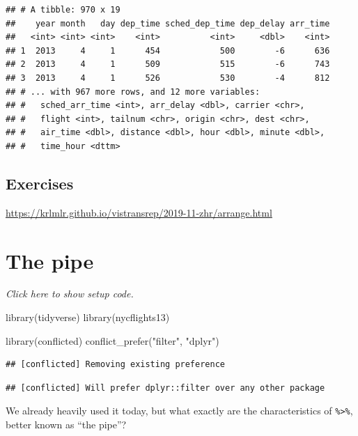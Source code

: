 \documentclass[]{book}
\newenvironment{Shaded}{}{}
\newcommand{\KeywordTok}[1]{\textcolor[rgb]{0.00,0.00,1.00}{#1}}
\newcommand{\NormalTok}[1]{#1}
\newcommand{\StringTok}[1]{\textcolor[rgb]{0.00,0.50,0.50}{#1}}
\begin{document}
\begin{verbatim}
## # A tibble: 970 x 19
##    year month   day dep_time sched_dep_time dep_delay arr_time
##   <int> <int> <int>    <int>          <int>     <dbl>    <int>
## 1  2013     4     1      454            500        -6      636
## 2  2013     4     1      509            515        -6      743
## 3  2013     4     1      526            530        -4      812
## # ... with 967 more rows, and 12 more variables:
## #   sched_arr_time <int>, arr_delay <dbl>, carrier <chr>,
## #   flight <int>, tailnum <chr>, origin <chr>, dest <chr>,
## #   air_time <dbl>, distance <dbl>, hour <dbl>, minute <dbl>,
## #   time_hour <dttm>
\end{verbatim}

\hypertarget{exercises-1}{%
\subsection*{Exercises}\label{exercises-1}}

\url{https://krlmlr.github.io/vistransrep/2019-11-zhr/arrange.html}

\hypertarget{the-pipe}{%
\section{The pipe}\label{the-pipe}}

\emph{Click here to show setup code.}

\begin{Shaded}
\begin{Highlighting}[]
\KeywordTok{library}\NormalTok{(tidyverse)}
\KeywordTok{library}\NormalTok{(nycflights13)}

\KeywordTok{library}\NormalTok{(conflicted)}
\KeywordTok{conflict_prefer}\NormalTok{(}\StringTok{"filter"}\NormalTok{, }\StringTok{"dplyr"}\NormalTok{)}
\end{Highlighting}
\end{Shaded}

\begin{verbatim}
## [conflicted] Removing existing preference
\end{verbatim}

\begin{verbatim}
## [conflicted] Will prefer dplyr::filter over any other package
\end{verbatim}

We already heavily used it today, but what exactly are the characteristics of \texttt{\%\textgreater{}\%}, better known as ``the pipe''?
\end{document}
